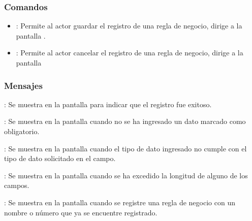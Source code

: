 \subsubsection{Comandos}
\begin{itemize}
	\item {}: Permite al actor guardar el registro de una regla de negocio, dirige a la pantalla .
	\item {}: Permite al actor cancelar el registro de una regla de negocio, dirige a la pantalla 
\end{itemize}

\subsubsection{Mensajes}

\begin{Citemize}
	\item {}: Se muestra en la pantalla  para indicar que el registro fue exitoso.
	\item {}: Se muestra en la pantalla  cuando no se ha ingresado un dato marcado como obligatorio.
	\item {}: Se muestra en la pantalla  cuando el tipo de dato ingresado no cumple con el tipo de dato solicitado en el campo.
	\item {}: Se muestra en la pantalla  cuando se ha excedido la longitud de alguno de los campos.
	\item {}: Se muestra en la pantalla  cuando se registre una regla de negocio con un nombre o número que ya se encuentre registrado.
\end{Citemize}
